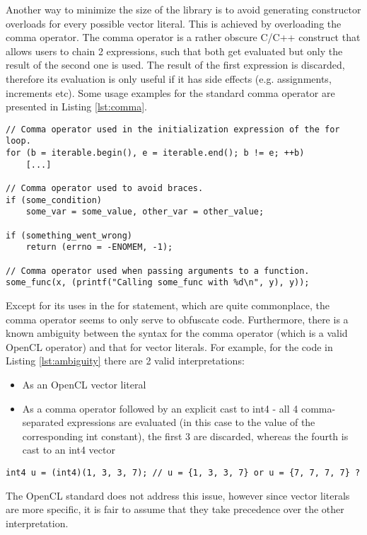 Another way to minimize the size of the library is to avoid generating constructor overloads for every possible vector literal. This is achieved by overloading the comma operator. The comma operator is a rather obscure C/C++ construct that allows users to chain 2 expressions, such that both get evaluated but only the result of the second one is used. The result of the first expression is discarded, therefore its evaluation is only useful if it has side effects (e.g. assignments, increments etc). Some usage examples for the standard comma operator are presented in Listing \ref{lst:comma}. 

\begin{lstlisting}[label=lst:comma, caption=Comma operator examples]
// Comma operator used in the initialization expression of the for loop.
for (b = iterable.begin(), e = iterable.end(); b != e; ++b)
	[...]

// Comma operator used to avoid braces.
if (some_condition)
	some_var = some_value, other_var = other_value;

if (something_went_wrong)
	return (errno = -ENOMEM, -1);
	
// Comma operator used when passing arguments to a function.
some_func(x, (printf("Calling some_func with %d\n", y), y));
\end{lstlisting}

Except for its uses in the for statement, which are quite commonplace, the comma operator seems to only serve to obfuscate code. Furthermore, there is a known ambiguity between the syntax for the comma operator (which is a valid OpenCL operator) and that for vector literals. For example, for the code in Listing \ref{lst:ambiguity} there are 2 valid interpretations:
\begin{itemize}
\item As an OpenCL vector literal
\item As a comma operator followed by an explicit cast to int4 - all 4 comma-separated expressions are evaluated (in this case to the value of the corresponding int constant), the first 3 are discarded, whereas the fourth is cast to an int4 vector
\end{itemize}

\begin{lstlisting}[label=lst:ambiguity, caption=OpenCL vector literal ambiguity]
int4 u = (int4)(1, 3, 3, 7); // u = {1, 3, 3, 7} or u = {7, 7, 7, 7} ?
\end{lstlisting}
The OpenCL standard does not address this issue, however since vector literals are more specific, it is fair to assume that they take precedence over the other interpretation.

